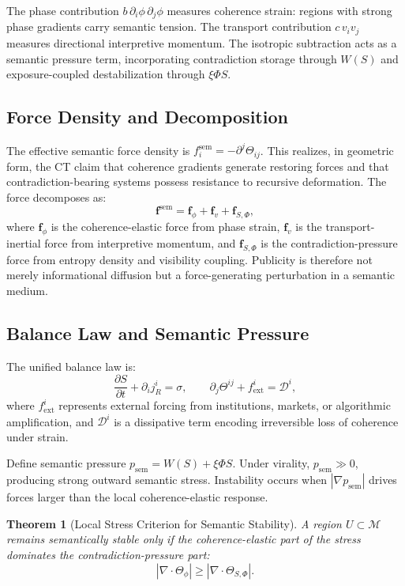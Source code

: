 \documentclass[12pt,a4paper]{article}
\newtheorem{theorem}{Theorem}
\begin{document}
The phase contribution $b\,\partial_i\phi\,\partial_j\phi$ measures coherence strain: regions with strong phase gradients carry semantic tension. The transport contribution $c\,v_iv_j$ measures directional interpretive momentum. The isotropic subtraction acts as a semantic pressure term, incorporating contradiction storage through $W(S)$ and exposure-coupled destabilization through $\xi\Phi S$.

\subsection{Force Density and Decomposition}

The effective semantic force density is $f_i^{\mathrm{sem}} = -\partial^j\Theta_{ij}$. This realizes, in geometric form, the CT claim that coherence gradients generate restoring forces and that contradiction-bearing systems possess resistance to recursive deformation. The force decomposes as:
\[
\mathbf{f}^{\mathrm{sem}}
=
\mathbf{f}_{\phi}
+
\mathbf{f}_{v}
+
\mathbf{f}_{S,\Phi},
\]
where $\mathbf{f}_{\phi}$ is the coherence-elastic force from phase strain, $\mathbf{f}_{v}$ is the transport-inertial force from interpretive momentum, and $\mathbf{f}_{S,\Phi}$ is the contradiction-pressure force from entropy density and visibility coupling. Publicity is therefore not merely informational diffusion but a force-generating perturbation in a semantic medium.

\subsection{Balance Law and Semantic Pressure}

The unified balance law is:
\[
\frac{\partial S}{\partial t}
+
\partial_i j_R^i
=
\sigma,
\qquad
\partial_j \Theta^{ij}
+
f_{\mathrm{ext}}^i
=
\mathcal{D}^i,
\]
where $f_{\mathrm{ext}}^i$ represents external forcing from institutions, markets, or algorithmic amplification, and $\mathcal{D}^i$ is a dissipative term encoding irreversible loss of coherence under strain.

Define semantic pressure $p_{\mathrm{sem}} = W(S) + \xi\Phi S$. Under virality, $p_{\mathrm{sem}} \gg 0$, producing strong outward semantic stress. Instability occurs when $|\nabla p_{\mathrm{sem}}|$ drives forces larger than the local coherence-elastic response.

\begin{theorem}[Local Stress Criterion for Semantic Stability]
A region $U \subset \mathcal{M}$ remains semantically stable only if the coherence-elastic part of the stress dominates the contradiction-pressure part:
\[
\left|\nabla \cdot \Theta_{\phi}\right|
\geq
\left|\nabla \cdot \Theta_{S,\Phi}\right|.
\]
\end{theorem}
\end{document}
